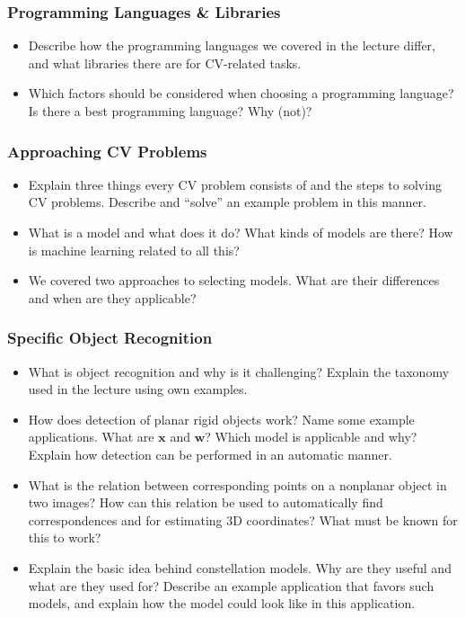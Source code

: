 \documentclass[paper=A4,11pt]{scrartcl}
\renewcommand{\vec}[1]{\ensuremath{\mathbf{#1}}}
\newcommand{\vx}{\vec{x}}
\newcommand{\vw}{\vec{w}}
\begin{document}
\subsubsection*{Programming Languages \& Libraries} %

\begin{itemize}
    \item Describe how the programming languages we covered in the lecture differ, and what libraries there are for CV-related tasks.
    \item Which factors should be considered when choosing a programming language? Is there a best programming language? Why (not)?
\end{itemize}

\subsubsection*{Approaching CV Problems} %

\begin{itemize}
    \item Explain three things every CV problem consists of and the steps to solving CV problems. Describe and \enquote{solve} an example problem in this manner.
    \item What is a model and what does it do? What kinds of models are there? How is machine learning related to all this?
    \item We covered two approaches to selecting models. What are their differences and when are they applicable?
\end{itemize}

\subsubsection*{Specific Object Recognition} %

\begin{itemize}
    \item What is object recognition and why is it challenging? Explain the taxonomy used in the lecture using own examples.
    \item How does detection of planar rigid objects work? Name some example applications. What are $\vx$ and $\vw$? Which model is applicable and why? Explain how detection can be performed in an automatic manner.
    \item What is the relation between corresponding points on a nonplanar object in two images? How can this relation be used to automatically find correspondences and for estimating 3D coordinates? What must be known for this to work?
    \item Explain the basic idea behind constellation models. Why are they useful and what are they used for? Describe an example application that favors such models, and explain how the model could look like in this application.
\end{itemize}
\end{document}

